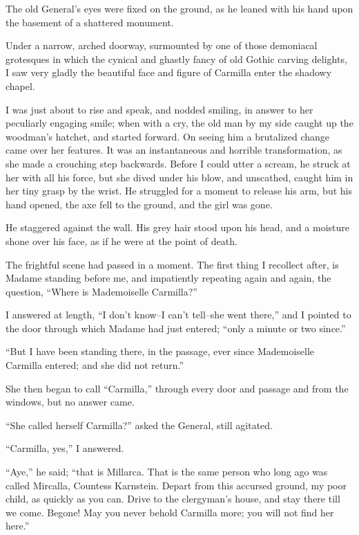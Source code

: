 \documentclass[11pt,twoside,makeidx,hidelinks,]{memoir}
\begin{document}
The old General's eyes were fixed on the ground, as he leaned with his
hand upon the basement of a shattered monument.

Under a narrow, arched doorway, surmounted by one of those demoniacal
grotesques in which the cynical and ghastly fancy of old Gothic carving
delights, I saw very gladly the beautiful face and figure of Carmilla
enter the shadowy chapel.

I was just about to rise and speak, and nodded smiling, in answer to her
peculiarly engaging smile; when with a cry, the old man by my side
caught up the woodman's hatchet, and started forward. On seeing him a
brutalized change came over her features. It was an instantaneous and
horrible transformation, as she made a crouching step backwards. Before
I could utter a scream, he struck at her with all his force, but she
dived under his blow, and unscathed, caught him in her tiny grasp by the
wrist. He struggled for a moment to release his arm, but his hand
opened, the axe fell to the ground, and the girl was gone.

He staggered against the wall. His grey hair stood upon his head, and a
moisture shone over his face, as if he were at the point of death.

The frightful scene had passed in a moment. The first thing I recollect
after, is Madame standing before me, and impatiently repeating again and
again, the question, ``Where is Mademoiselle Carmilla?''

I answered at length, ``I don't know--I can't tell--she went there,'' and
I pointed to the door through which Madame had just entered; ``only a
minute or two since.''

``But I have been standing there, in the passage, ever since Mademoiselle
Carmilla entered; and she did not return.''

She then began to call ``Carmilla,'' through every door and passage and
from the windows, but no answer came.

``She called herself Carmilla?'' asked the General, still agitated.

``Carmilla, yes,'' I answered.

``Aye,'' he said; ``that is Millarca. That is the same person who long ago
was called Mircalla, Countess Karnstein. Depart from this accursed
ground, my poor child, as quickly as you can. Drive to the clergyman's
house, and stay there till we come. Begone! May you never behold
Carmilla more; you will not find her here.''

\pbreak{}
\end{document}
